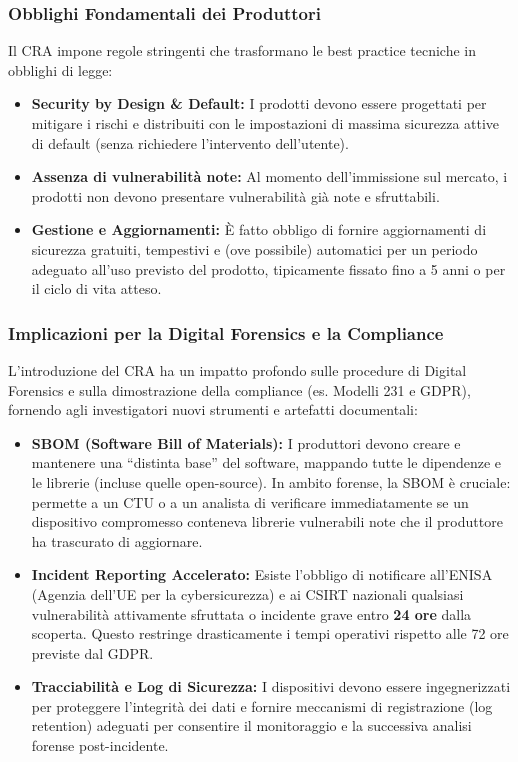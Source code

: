 \documentclass[11pt,a4paper]{article}
\begin{document}
\subsubsection{Obblighi Fondamentali dei Produttori}
Il CRA impone regole stringenti che trasformano le best practice tecniche in obblighi di legge:
\begin{itemize}
    \item \textbf{Security by Design \& Default:} I prodotti devono essere progettati per mitigare i rischi e distribuiti con le impostazioni di massima sicurezza attive di default (senza richiedere l'intervento dell'utente).
    \item \textbf{Assenza di vulnerabilità note:} Al momento dell'immissione sul mercato, i prodotti non devono presentare vulnerabilità già note e sfruttabili.
    \item \textbf{Gestione e Aggiornamenti:} È fatto obbligo di fornire aggiornamenti di sicurezza gratuiti, tempestivi e (ove possibile) automatici per un periodo adeguato all'uso previsto del prodotto, tipicamente fissato fino a 5 anni o per il ciclo di vita atteso.
\end{itemize}

\subsubsection{Implicazioni per la Digital Forensics e la Compliance}
L'introduzione del CRA ha un impatto profondo sulle procedure di Digital Forensics e sulla dimostrazione della compliance (es. Modelli 231 e GDPR), fornendo agli investigatori nuovi strumenti e artefatti documentali:
\begin{itemize}
    \item \textbf{SBOM (Software Bill of Materials):} I produttori devono creare e mantenere una ``distinta base'' del software, mappando tutte le dipendenze e le librerie (incluse quelle open-source). In ambito forense, la SBOM è cruciale: permette a un CTU o a un analista di verificare immediatamente se un dispositivo compromesso conteneva librerie vulnerabili note che il produttore ha trascurato di aggiornare.
    \item \textbf{Incident Reporting Accelerato:} Esiste l'obbligo di notificare all'ENISA (Agenzia dell'UE per la cybersicurezza) e ai CSIRT nazionali qualsiasi vulnerabilità attivamente sfruttata o incidente grave entro \textbf{24 ore} dalla scoperta. Questo restringe drasticamente i tempi operativi rispetto alle 72 ore previste dal GDPR.
    \item \textbf{Tracciabilità e Log di Sicurezza:} I dispositivi devono essere ingegnerizzati per proteggere l'integrità dei dati e fornire meccanismi di registrazione (log retention) adeguati per consentire il monitoraggio e la successiva analisi forense post-incidente.
\end{itemize}
\end{document}
